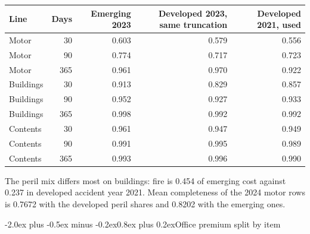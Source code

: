 \documentclass[11pt,a4paper]{article}
\makeatletter
\renewcommand\section{\@startsection{section}{1}{\z@}%
  {-2.0ex plus -0.5ex minus -0.2ex}{0.8ex plus 0.2ex}{\normalfont\large\bfseries}}
\newenvironment{fixedtable}%
  {\par\medskip\noindent\begin{minipage}{\linewidth}\def\@captype{table}\centering}%
  {\end{minipage}\par\medskip}
\newcommand{\code}[1]{\texttt{#1}}
\makeatother
\begin{document}
\begin{fixedtable}
\centering\small
\begin{tabular}{lrrrr}
\toprule
Line & Days & Emerging 2023 & Developed 2023, same truncation & Developed 2021, used\\
\midrule
Motor & 30 & 0.603 & 0.579 & 0.556\\
Motor & 90 & 0.774 & 0.717 & 0.723\\
Motor & 365 & 0.961 & 0.970 & 0.922\\
Buildings & 30 & 0.913 & 0.829 & 0.857\\
Buildings & 90 & 0.952 & 0.927 & 0.933\\
Buildings & 365 & 0.998 & 0.992 & 0.992\\
Contents & 30 & 0.961 & 0.947 & 0.949\\
Contents & 90 & 0.991 & 0.995 & 0.989\\
Contents & 365 & 0.993 & 0.996 & 0.990\\
\bottomrule
\end{tabular}
\caption{Cost-weighted cumulative share reported (\code{docs/part2\_emerging\_target\_summary.txt}, C037).}
\end{fixedtable}

The peril mix differs most on buildings: fire is 0.454 of emerging cost against 0.237 in developed accident year 2021.
Mean completeness of the 2024 motor rows is 0.7672 with the developed peril shares and 0.8202 with the emerging ones.

\section{Office premium split by item}
\label{app:op}
\end{document}
